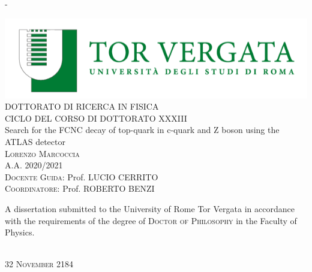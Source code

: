 
\begin{adjustwidth*}{\unitlength}{-\unitlength}
	\begin{center}
		\includegraphics[scale=1]{frontmatter/figures/uniroma2}\\
		\vspace{1cm}
		{\large\textsc{DOTTORATO DI RICERCA IN FISICA}}\\
		\vspace{0.8cm}
		{\large\textsc{CICLO DEL CORSO DI DOTTORATO XXXIII}}\\
		\vspace{1cm}
		{\LARGE{Search for the FCNC decay of top-quark in c-quark and Z boson using the ATLAS detector}}\\
		\vspace{6.5mm}
		{\large\textsc{Lorenzo Marcoccia}}\\
		\vspace{1cm}
		{\large\textsc{A.A. 2020/2021}}\\
		\vspace{10mm}
		{\large{\textsc{Docente Guida:}  Prof. LUCIO CERRITO}}\\ 
		\vspace{5mm}
		{\large{\textsc{Coordinatore:   }  Prof. ROBERTO BENZI}}\\ 
		\vspace{3mm}
		\begin{minipage}{10cm}
			\vspace{1cm}
			A dissertation submitted to the University of Rome Tor Vergata  in accordance with the requirements of the degree of \textsc{Doctor of Philosophy} in the Faculty of Physics.
		\end{minipage}\\
		\vspace{9mm}
		{\large\textsc{32 November 2184}}
		\vspace{12mm}
	\end{center}
\end{adjustwidth*}
\newpage